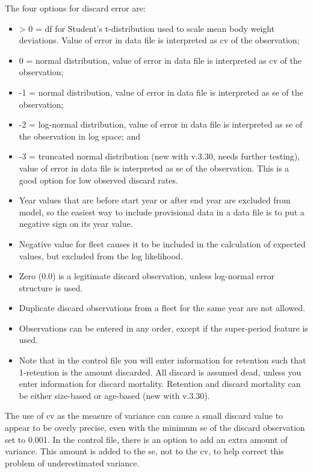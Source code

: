 The four options for discard error are:
\begin{itemize}
	\item > 0 = \gls{df} for Student's t-distribution used to scale mean body weight deviations. Value of error in data file is interpreted as \gls{cv} of the observation;
	\item 0 = normal distribution, value of error in data file is interpreted as \gls{cv} of the observation;
	\item -1 = normal distribution, value of error in data file is interpreted as \gls{se} of the observation;
	\item -2 = log-normal distribution, value of error in data file is interpreted as \gls{se} of the observation in log space; and 
	\item -3 = truncated normal distribution (new with v.3.30, needs further testing), value of error in data file is interpreted as \gls{se} of the observation. This is a good option for low observed discard rates.
\end{itemize}

\begin{itemize}
	\item Year values that are before start year or after end year are excluded from model, so the easiest way to include provisional data in a data file is to put a negative sign on its year value.
	\item Negative value for fleet causes it to be included in the calculation of expected values, but excluded from the log likelihood.
	\item Zero (0.0) is a legitimate discard observation, unless log-normal error structure is used.
	\item Duplicate discard observations from a fleet for the same year are not allowed.
	\item Observations can be entered in any order, except if the super-period feature is used. 
	\item Note that in the control file you will enter information for retention such that 1-retention is the amount discarded. All discard is assumed dead, unless you enter information for discard mortality. Retention and discard mortality can be either size-based or age-based (new with v.3.30).
\end{itemize}
	
The use of \gls{cv} as the measure of variance can cause a small discard value to appear to be overly precise, even with the minimum \gls{se} of the discard observation set to 0.001. In the control file, there is an option to add an extra amount of variance. This amount is added to the \gls{se}, not to the \gls{cv}, to help correct this problem of underestimated variance.

